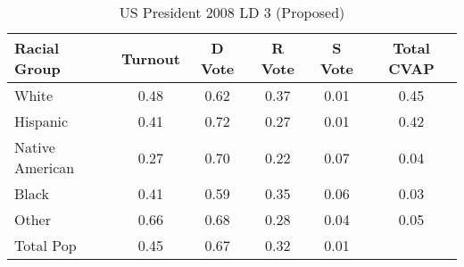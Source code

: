 \begin{table}[htb]
\begin{center}
\caption{US President 2008 LD 3 (Proposed)}
\label{pres08_cvap_ld_3}
\begin{tabular}{lccccc}
  \hline
Racial Group & Turnout & D Vote & R Vote & S Vote & Total CVAP \\ 
  \hline
White & 0.48 & 0.62 & 0.37 & 0.01 & 0.45 \\ 
  Hispanic & 0.41 & 0.72 & 0.27 & 0.01 & 0.42 \\ 
  Native American & 0.27 & 0.70 & 0.22 & 0.07 & 0.04 \\ 
  Black & 0.41 & 0.59 & 0.35 & 0.06 & 0.03 \\ 
  Other & 0.66 & 0.68 & 0.28 & 0.04 & 0.05 \\ 
  Total Pop & 0.45 & 0.67 & 0.32 & 0.01 &  \\ 
   \hline
\end{tabular}
\end{center}
\end{table}
